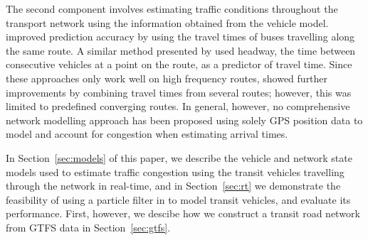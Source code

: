 The second component involves estimating traffic conditions throughout the transport network
using the information obtained from the vehicle model.
\cite{Yu_2010} improved prediction accuracy by using the travel times
of buses travelling along the same route.
A similar method presented by \cite{Hans_2015}
used headway, the time between consecutive vehicles at a point on the route,
as a predictor of travel time.
Since these approaches only work well on high frequency routes,
\cite{Yu_2011} showed further improvements by combining travel times 
from several routes;
however, this was limited to predefined converging routes.
In general, however, no comprehensive network modelling approach has been proposed using
solely GPS position data to model and account for congestion when estimating arrival times.


In Section~\ref{sec:models} of this paper, 
we describe the \rt vehicle and network state models
used to estimate traffic congestion using the transit vehicles
travelling through the network in real-time,
and in Section~\ref{sec:rt} we demonstrate the feasibility of using a particle filter
in \rt to model transit vehicles,
and evaluate its performance.
First, however, we descibe how we construct a
transit road network from GTFS data in Section~\ref{sec:gtfs}.



